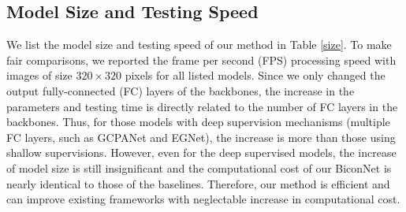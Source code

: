 \documentclass[final]{cvpr}
\begin{document}
\subsection{Model Size and Testing Speed}
We list the model size and testing speed of our method in Table \ref{size}. To make fair comparisons, we reported the frame per second (FPS) processing speed with images of size $320 \times 320$ pixels for all listed models. Since we only changed the output fully-connected (FC) layers of the backbones, the increase in the parameters and testing time is directly related to the number of FC layers in the backbones. Thus, for those models with deep supervision mechanisms (multiple FC layers, such as GCPANet and EGNet), the increase is more than those using shallow supervisions. However, even for the deep supervised models, the increase of model size is still insignificant and the computational cost of our BiconNet is nearly identical to those of the baselines. Therefore, our method is efficient and can improve existing frameworks with neglectable increase in computational cost. 

\begin{table*}[h!]
\renewcommand\arraystretch{1.5}
\centering
{}
\end{table*}
\end{document}
